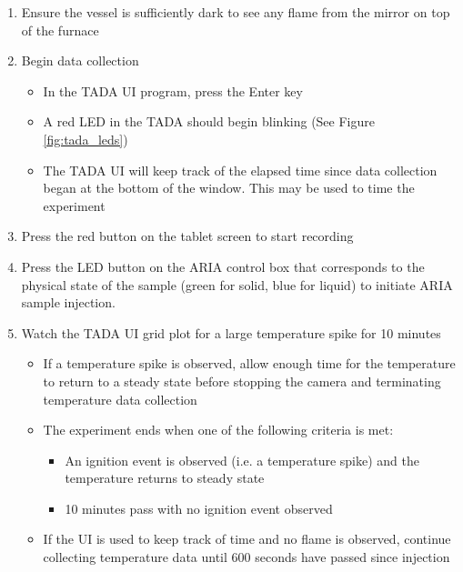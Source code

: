 \documentclass[letterpaper,11pt]{article}
\begin{document}
\begin{enumerate}
\begin{itemize}
		\end{itemize} 

	\item Ensure the vessel is sufficiently dark to see any 
        flame from the mirror on top of the furnace
	
	\item Begin data collection 
		\begin{itemize}
		\item In the TADA UI program, press the Enter key
		\item A red LED in the TADA should begin blinking (See 
            Figure \ref{fig:tada_leds})
		\item The TADA UI will keep track of the elapsed time since data 
          collection began at the bottom of the window. This may be used
          to time the experiment
		\end{itemize}
	
    \item Press the red button on the tablet 
        screen to start recording
		
	\item Press the LED button on the ARIA control box that corresponds to the 
        physical state of the sample
		(green for solid, blue for liquid) to initiate ARIA sample injection.
            
    \item Watch the TADA UI grid plot for a large temperature spike for 10 minutes
        \begin{itemize}
        \item If a temperature spike is observed, allow enough time for the
            temperature to return to a steady state before stopping the camera 
            and terminating temperature data collection
        
        \item The experiment ends when one of the following criteria is met:
            \begin{itemize} 
            \item An ignition event is observed (i.e. a temperature spike) 
                and the temperature returns to steady state
            \item 10 minutes pass with no ignition event observed
            \end{itemize}
        \item If the UI is used to keep track of time and no flame is observed, 
            continue collecting temperature data until 600 seconds have passed 
            since injection
        \end{itemize}
    

\end{enumerate}
\end{document}
